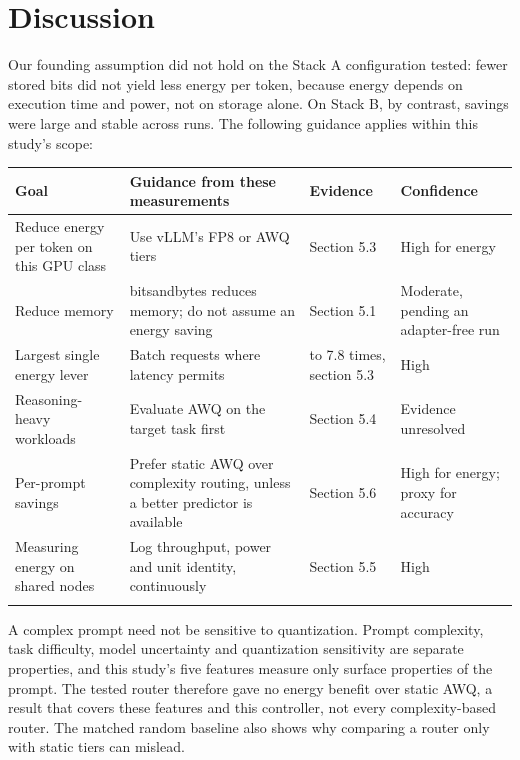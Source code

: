 \section{Discussion}
Our founding assumption did not hold on the Stack A configuration tested: fewer stored bits did not yield less energy per token, because energy depends on execution time and power, not on storage alone. On Stack B, by contrast, savings were large and stable across runs. The following guidance applies within this study's scope:


\begingroup\footnotesize\setlength{\tabcolsep}{4pt}
\begin{longtable}{>{\raggedright\arraybackslash}p{40.2mm}>{\raggedright\arraybackslash}p{40.8mm}>{\raggedright\arraybackslash}p{24.6mm}>{\raggedright\arraybackslash}p{33.3mm}}
\toprule
\textbf{Goal} & \textbf{Guidance from these measurements} & \textbf{Evidence} & \textbf{Confidence} \\
\midrule
\endhead
Reduce energy per token on this GPU class & Use vLLM's FP8 or AWQ tiers & Section 5.3 & High for energy \\*
Reduce memory & bitsandbytes reduces memory; do not assume an energy saving & Section 5.1 & Moderate, pending an adapter-free run \\*
Largest single energy lever & Batch requests where latency permits & 6.8 to 7.8 times, section 5.3 & High \\*
Reasoning-heavy workloads & Evaluate AWQ on the target task first & Section 5.4 & Evidence unresolved \\*
Per-prompt savings & Prefer static AWQ over complexity routing, unless a better predictor is available & Section 5.6 & High for energy; proxy for accuracy \\*
Measuring energy on shared nodes & Log throughput, power and unit identity, continuously & Section 5.5 & High \\*
\bottomrule\noalign{\nobreak}
\end{longtable}
\addtocounter{table}{-1}
\endgroup

A complex prompt need not be sensitive to quantization. Prompt complexity, task difficulty, model uncertainty and quantization sensitivity are separate properties, and this study's five features measure only surface properties of the prompt. The tested router therefore gave no energy benefit over static AWQ, a result that covers these features and this controller, not every complexity-based router. The matched random baseline also shows why comparing a router only with static tiers can mislead.

